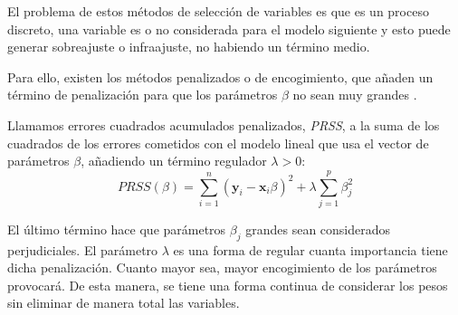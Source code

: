 \noindent El problema de estos métodos de selección de variables es que es un proceso discreto, una variable es o no considerada para el modelo siguiente y esto puede generar sobreajuste o infraajuste, no habiendo un término medio. 

\noindent Para ello, existen los métodos penalizados o de encogimiento, que añaden un término de penalización para que los parámetros $\beta$ no sean muy grandes \cite{Hastie 2001}.

\begin{defi} 
Llamamos errores cuadrados acumulados penalizados, \emph{PRSS}, a la suma de los cuadrados de los errores cometidos con el modelo lineal que usa el  vector de parámetros $\beta$, añadiendo un término regulador $\lambda >0$: 
\begin{equation}
PRSS(\beta)=\sum_{i=1}^n(\textbf{y}_i-\textbf{x}_i\beta)^2+\lambda\sum_{j=1}^p\beta_j^2
\end{equation}
\end{defi}
\noindent El último término hace que parámetros $\beta_j$ grandes sean considerados perjudiciales. El parámetro $\lambda$ es una forma de regular cuanta importancia tiene dicha penalización. Cuanto mayor sea, mayor encogimiento de los parámetros provocará. 
De esta manera, se tiene una forma continua de considerar los pesos sin eliminar de manera total las variables.














